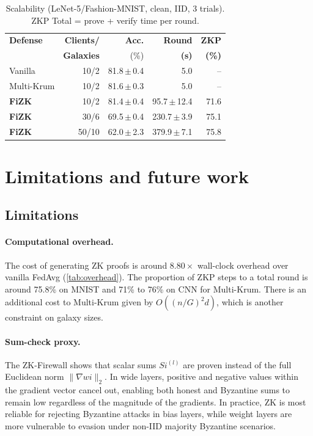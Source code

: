 \documentclass[10pt,twocolumn,letterpaper]{article}
\begin{document}
\begin{table}[t]
  \centering
  \small
  \caption{Scalability (LeNet-5/Fashion-MNIST, clean, IID, 3 trials).
    ZKP Total = prove + verify time per round.}
  \label{tab:cnn_scale}
  \setlength{\tabcolsep}{5pt}
  \begin{tabular}{@{}lrrrr@{}}
    \toprule
    \textbf{Defense} & \textbf{Clients/} & \textbf{Acc.} & \textbf{Round} & \textbf{ZKP} \\
                     & \textbf{Galaxies} & (\%)          & \textbf{(s)}   & \textbf{(\%)} \\
    \midrule
    Vanilla  & 10/2  & 81.8\,$\pm$\,0.4 & 5.0   & --   \\
    Multi-Krum & 10/2  & 81.6\,$\pm$\,0.3 & 5.0  & --   \\
    \textbf{FiZK} & 10/2  & 81.4\,$\pm$\,0.4 & 95.7\,$\pm$\,12.4 & 71.6 \\
    \textbf{FiZK} & 30/6  & 69.5\,$\pm$\,0.4 & 230.7\,$\pm$\,3.9 & 75.1 \\
    \textbf{FiZK} & 50/10 & 62.0\,$\pm$\,2.3 & 379.9\,$\pm$\,7.1 & 75.8 \\
    \bottomrule
  \end{tabular}
\end{table}
\section{Limitations and future work}
\label{sec:future}

\subsection{Limitations}

\paragraph{Computational overhead.}
The cost of generating ZK proofs is around $8.80\times$ wall-clock overhead over vanilla FedAvg (\cref{tab:overhead}). The proportion of ZKP steps to a total round is around 75.8\% on MNIST and 71\% to 76\% on CNN for Multi-Krum. There is an additional cost to Multi-Krum given by $O\!\left((n/G)^2 d\right)$, which is another constraint on galaxy sizes.

\paragraph{Sum-check proxy.}
The ZK-Firewall shows that scalar sums $S{i}^{(l)}$ are proven instead of the full Euclidean norm $\| \nabla w{i}\|_{2}.$
In wide layers, positive and negative values within the gradient vector cancel out, enabling both honest and Byzantine
sums to remain low regardless of the magnitude of the gradients.
In practice, ZK is most reliable for rejecting Byzantine attacks in bias layers, while weight layers are more vulnerable
to evasion under non-IID majority Byzantine scenarios.
\end{document}
